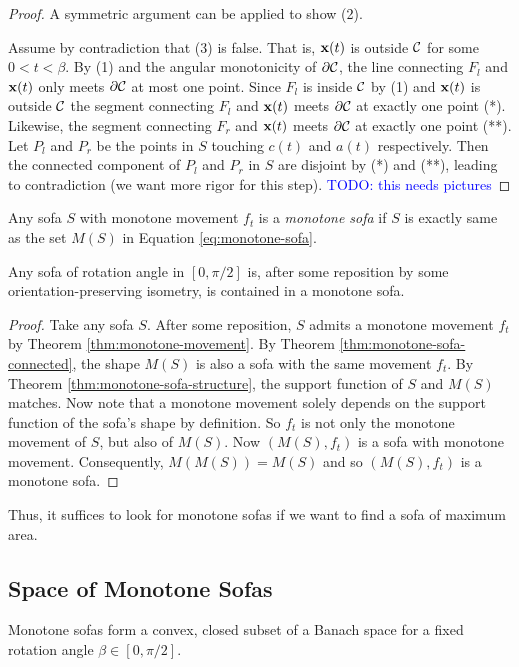 \begin{proof}
A symmetric argument can be applied to show (2).

Assume by contradiction that (3) is false. That is, $\mathbf{x}(t)$ is outside $\mathcal{C}$ for some $0 < t < \beta$.
By (1) and the angular monotonicity of $\partial \mathcal{C}$, the line connecting $F_l$ and $\mathbf{x}(t)$ only meets $\partial \mathcal{C}$ at most one point.
Since $F_l$ is inside $\mathcal{C}$ by (1) and $\mathbf{x}(t)$ is outside $\mathcal{C}$ the segment connecting $F_l$ and $\mathbf{x}(t)$ meets $\partial \mathcal{C}$ at exactly one point (*).
Likewise, the segment connecting $F_r$ and $\mathbf{x}(t)$ meets $\partial \mathcal{C}$ at exactly one point (**).
Let $P_l$ and $P_r$ be the points in $S$ touching $c(t)$ and $a(t)$ respectively. 
Then the connected component of $P_l$ and $P_r$ in $S$ are disjoint by (*) and (**), leading to contradiction (we want more rigor for this step).
\textcolor{blue}{TODO: this needs pictures}
\end{proof}

\begin{definition}
Any sofa $S$ with monotone movement $f_t$ is a \emph{monotone sofa} if $S$ is exactly same as the set $M(S)$ in Equation \ref{eq:monotone-sofa}.
\end{definition}
\begin{theorem}
Any sofa of rotation angle in $[0, \pi / 2]$ is, after some reposition by some orientation-preserving isometry, is contained in a monotone sofa.
\end{theorem}
\begin{proof}
Take any sofa $S$. After some reposition, $S$ admits a monotone movement $f_t$ by Theorem \ref{thm:monotone-movement}.
By Theorem \ref{thm:monotone-sofa-connected}, the shape $M(S)$ is also a sofa with the same movement $f_t$.
By Theorem \ref{thm:monotone-sofa-structure}, the support function of $S$ and $M(S)$ matches.
Now note that a monotone movement solely depends on the support function of the sofa's shape by definition.
So $f_t$ is not only the monotone movement of $S$, but also of $M(S)$.
Now $(M(S), f_t)$ is a sofa with monotone movement. Consequently, $M(M(S)) = M(S)$ and so $(M(S), f_t)$ is a monotone sofa. 
\end{proof}
Thus, it suffices to look for monotone sofas if we want to find a sofa of maximum area.

\subsection{Space of Monotone Sofas}
Monotone sofas form a convex, closed subset of a Banach space for a fixed rotation angle $\beta \in [0, \pi / 2]$.

